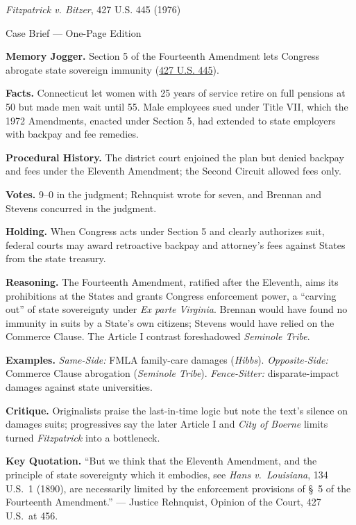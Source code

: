 \documentclass[12pt]{article}
\begin{document}
\begin{center}
{\Large \textit{Fitzpatrick v. Bitzer}, 427 U.S. 445 (1976)\par}
\vspace{0.3em}
{\normalsize Case Brief --- One-Page Edition\par}
\end{center}

\textbf{Memory Jogger.} Section 5 of the Fourteenth Amendment lets Congress abrogate state sovereign immunity (\href{https://supreme.justia.com/cases/federal/us/427/445/}{427 U.S. 445}).

\textbf{Facts.} Connecticut let women with 25 years of service retire on full pensions at 50 but made men wait until 55. Male employees sued under Title VII, which the 1972 Amendments, enacted under Section 5, had extended to state employers with backpay and fee remedies.

\textbf{Procedural History.} The district court enjoined the plan but denied backpay and fees under the Eleventh Amendment; the Second Circuit allowed fees only.

\textbf{Votes.} 9--0 in the judgment; Rehnquist wrote for seven, and Brennan and Stevens concurred in the judgment.

\textbf{Holding.} When Congress acts under Section 5 and clearly authorizes suit, federal courts may award retroactive backpay and attorney's fees against States from the state treasury.

\textbf{Reasoning.} The Fourteenth Amendment, ratified after the Eleventh, aims its prohibitions at the States and grants Congress enforcement power, a ``carving out'' of state sovereignty under \textit{Ex parte Virginia}. Brennan would have found no immunity in suits by a State's own citizens; Stevens would have relied on the Commerce Clause. The Article I contrast foreshadowed \textit{Seminole Tribe}.

\textbf{Examples.} \emph{Same-Side:} FMLA family-care damages (\textit{Hibbs}). \emph{Opposite-Side:} Commerce Clause abrogation (\textit{Seminole Tribe}). \emph{Fence-Sitter:} disparate-impact damages against state universities.

\textbf{Critique.} Originalists praise the last-in-time logic but note the text's silence on damages suits; progressives say the later Article I and \textit{City of Boerne} limits turned \textit{Fitzpatrick} into a bottleneck.

\textbf{Key Quotation.} ``But we think that the Eleventh Amendment, and the principle of state sovereignty which it embodies, see \textit{Hans v.\ Louisiana}, 134 U.S.\ 1 (1890), are necessarily limited by the enforcement provisions of \S~5 of the Fourteenth Amendment.'' --- Justice Rehnquist, Opinion of the Court, 427 U.S.\ at 456.
\end{document}
